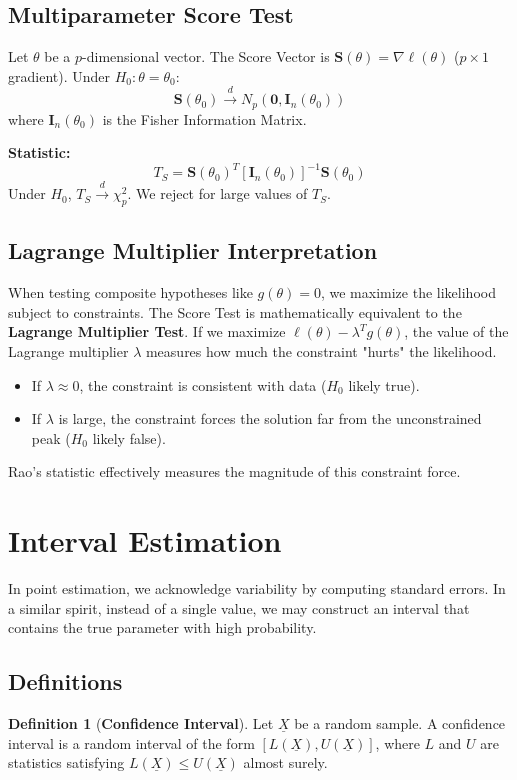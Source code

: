 \documentclass[12pt, a4paper]{article}
\theoremstyle{definition}
\newtheorem{definition}{Definition}
\newcommand{\Xvec}{\underline{X}}
\begin{document}
\subsection{Multiparameter Score Test}
Let $\theta$ be a $p$-dimensional vector.
The Score Vector is $\mathbf{S}(\theta) = \nabla \ell(\theta)$ ($p \times 1$ gradient).
Under $H_0: \theta = \theta_0$:
$$ \mathbf{S}(\theta_0) \xrightarrow{d} N_p(\mathbf{0}, \mathbf{I}_n(\theta_0)) $$
where $\mathbf{I}_n(\theta_0)$ is the Fisher Information Matrix.

\textbf{Statistic:}
$$ T_S = \mathbf{S}(\theta_0)^T [\mathbf{I}_n(\theta_0)]^{-1} \mathbf{S}(\theta_0) $$
Under $H_0$, $T_S \xrightarrow{d} \chi^2_p$.
We reject for large values of $T_S$.

\subsection{Lagrange Multiplier Interpretation}
When testing composite hypotheses like $g(\theta) = 0$, we maximize the likelihood subject to constraints.
The Score Test is mathematically equivalent to the \textbf{Lagrange Multiplier Test}.
If we maximize $\ell(\theta) - \lambda^T g(\theta)$, the value of the Lagrange multiplier $\lambda$ measures how much the constraint "hurts" the likelihood.
\begin{itemize}
    \item If $\lambda \approx 0$, the constraint is consistent with data ($H_0$ likely true).
    \item If $\lambda$ is large, the constraint forces the solution far from the unconstrained peak ($H_0$ likely false).
\end{itemize}
Rao's statistic effectively measures the magnitude of this constraint force.

\section{Interval Estimation}

In point estimation, we acknowledge variability by computing standard errors. In a similar spirit, instead of a single value, we may construct an interval that contains the true parameter with high probability.

\subsection{Definitions}
\begin{definition}[\textbf{Confidence Interval}]
Let $\Xvec$ be a random sample. A confidence interval is a random interval of the form $[L(\Xvec), U(\Xvec)]$, where $L$ and $U$ are statistics satisfying $L(\Xvec) \le U(\Xvec)$ almost surely.
\end{definition}
\end{document}
